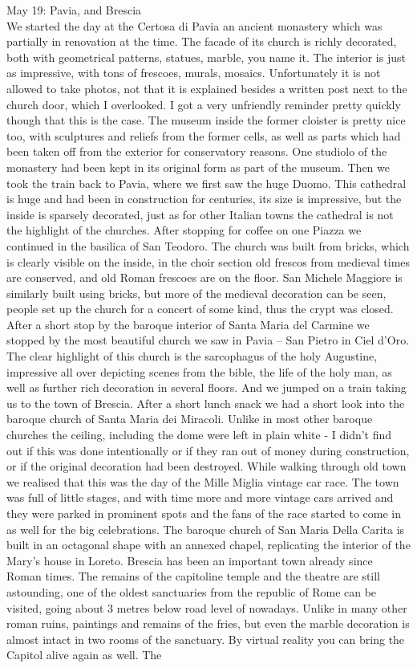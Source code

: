 May 19: Pavia, and Brescia\\
We started the day at the Certosa di Pavia an ancient monastery which was partially in renovation at the time. The facade of its church is richly decorated, both with geometrical patterns, statues, marble, you name it. The interior is just as impressive, with tons of frescoes, murals, mosaics. Unfortunately it is not allowed to take photos, not that it is explained besides a written post next to the church door, which I overlooked. I got a very unfriendly reminder pretty quickly though that this is the case. The museum inside the former cloister is pretty nice too, with sculptures and reliefs from the former cells, as well as parts which had been taken off from the exterior for conservatory reasons. One studiolo of the monastery had been kept in its original form as part of the museum. Then we took the train back to Pavia, where we first saw the huge Duomo. This cathedral is huge and had been in construction for centuries, its size is impressive, but the inside is sparsely decorated, just as for other Italian towns the cathedral is not the highlight of the churches. After stopping for coffee on one Piazza we continued in the basilica of San Teodoro. The church was built from bricks, which is clearly visible on the inside, in the choir section old frescos from medieval times are conserved, and old Roman frescoes are on the floor. San Michele Maggiore is similarly built using bricks, but more of the medieval decoration can be seen, people set up the church for a concert of some kind, thus the crypt was closed. After a short stop by the baroque interior of Santa Maria del Carmine we stopped by the most beautiful church we saw in Pavia -- San Pietro in Ciel d'Oro. The clear highlight of this church is the sarcophagus of the holy Augustine, impressive all over depicting scenes from the bible, the life of the holy man, as well as further rich decoration in several floors. And we jumped on a train taking us to the town of Brescia. After a short lunch snack we had a short look into the baroque church of Santa Maria dei Miracoli. Unlike in most other baroque churches the ceiling, including the dome were left in plain white - I didn't find out if this was done intentionally or if they ran out of money during construction, or if the original decoration had been destroyed. While walking through old town we realised that this was the day of the Mille Miglia vintage car race. The town was full of little stages, and with time more and more vintage cars arrived and they were parked in prominent spots and the fans of the race started to come in as well for the big celebrations. The baroque church of San Maria Della Carita is built in an octagonal shape with an annexed chapel, replicating the interior of the Mary's house in Loreto. Brescia has been an important town already since Roman times. The remains of the capitoline temple and the theatre are still astounding, one of the oldest sanctuaries from the republic of Rome can be visited, going about 3 metres below road level of nowadays. Unlike in many other roman ruins, paintings and remains of the fries, but even the marble decoration is almost intact in two rooms of the sanctuary. By virtual reality you can bring the Capitol alive again as well. The 